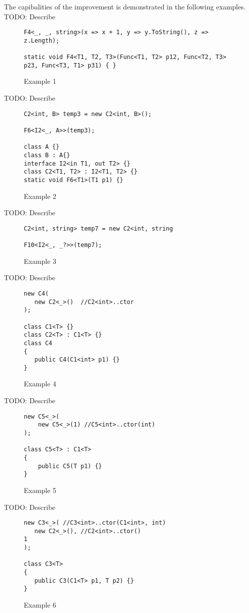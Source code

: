 The capibalities of the improvement is demonstrated in the following examples.
TODO: Describe
\begin{figure}[h]
\begin{lstlisting}[style=csharp, showstringspaces=false]
F4<_, _, string>(x => x + 1, y => y.ToString(), z => z.Length); 

static void F4<T1, T2, T3>(Func<T1, T2> p12, Func<T2, T3> p23, Func<T3, T1> p31) { }
\end{lstlisting}
\caption{Example 1}
\label{img73:example1}
\end{figure}
TODO: Describe
\begin{figure}[h]
\begin{lstlisting}[style=csharp, showstringspaces=false]
C2<int, B> temp3 = new C2<int, B>();

F6<I2<_, A>>(temp3);

class A {}
class B : A{}
interface I2<in T1, out T2> {}
class C2<T1, T2> : I2<T1, T2> {}
static void F6<T1>(T1 p1) {}
\end{lstlisting}
\caption{Example 2}
\label{img74:example2}
\end{figure}
TODO: Describe
\begin{figure}[h]
\begin{lstlisting}[style=csharp, showstringspaces=false]
C2<int, string> temp7 = new C2<int, string

F10<I2<_, _?>>(temp7);
\end{lstlisting}
\caption{Example 3}
\label{img75:example3}
\end{figure}
TODO: Describe
\begin{figure}[h]
\begin{lstlisting}[style=csharp, showstringspaces=false]
new C4(
   new C2<_>()  //C2<int>..ctor
);

class C1<T> {}
class C2<T> : C1<T> {}
class C4 
{
   public C4(C1<int> p1) {}
}
\end{lstlisting}
\caption{Example 4}
\label{img76:example4}
\end{figure}
TODO: Describe
\begin{figure}[h]
\begin{lstlisting}[style=csharp, showstringspaces=false]
new C5<_>(
    new C5<_>(1) //C5<int>..ctor(int)
);

class C5<T> : C1<T>
{
    public C5(T p1) {}
}
\end{lstlisting}
\caption{Example 5}
\label{img77:example5}
\end{figure}
TODO: Describe
\begin{figure}[h]
\begin{lstlisting}[style=csharp, showstringspaces=false]
new C3<_>( //C3<int>..ctor(C1<int>, int)
   new C2<_>(), //C2<int>..ctor()
1
);

class C3<T>
{
   public C3(C1<T> p1, T p2) {}
}
\end{lstlisting}
\caption{Example 6}
\label{img78:example6}
\end{figure}
